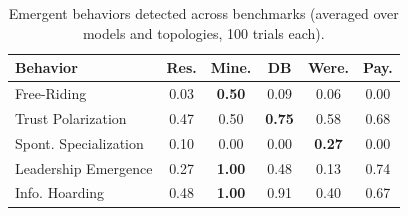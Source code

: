 \begin{table}[t]
\caption{Emergent behaviors detected across benchmarks (averaged over models and topologies, 100 trials each).}
\label{tab:emergent}
\centering
\begin{tabular}{@{}lccccc@{}}
\toprule
\textbf{Behavior} & \textbf{Res.} & \textbf{Mine.} & \textbf{DB} & \textbf{Were.} & \textbf{Pay.} \\
\midrule
Free-Riding & 0.03 & \textbf{0.50} & 0.09 & 0.06 & 0.00 \\
Trust Polarization & 0.47 & 0.50 & \textbf{0.75} & 0.58 & 0.68 \\
Spont. Specialization & 0.10 & 0.00 & 0.00 & \textbf{0.27} & 0.00 \\
Leadership Emergence & 0.27 & \textbf{1.00} & 0.48 & 0.13 & 0.74 \\
Info. Hoarding & 0.48 & \textbf{1.00} & 0.91 & 0.40 & 0.67 \\
\bottomrule
\end{tabular}
\end{table}